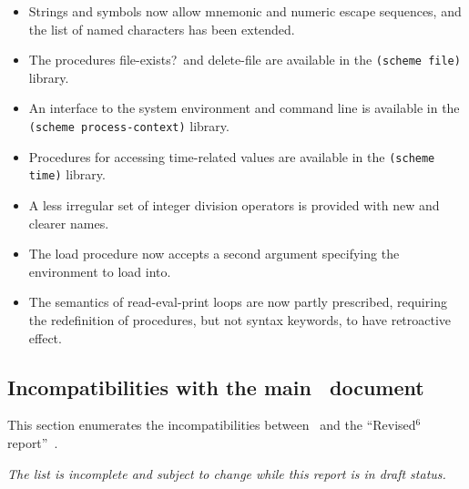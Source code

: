 \begin{itemize}
\item Strings and symbols now allow mnemonic and numeric escape
sequences, and the list of named characters has been extended.

\item The procedures {\cf file-exists?}\ and {\cf delete-file} are available in the
{\tt (scheme file)} library.

\item An interface to the system environment and command line is
available in the {\tt (scheme process-context)} library.

\item Procedures for accessing time-related values are available in the
{\tt (scheme time)} library.

\item A less irregular set of integer division operators is provided
with new and clearer names.

\item The {\cf load} procedure now accepts a second argument specifying the environment to
load into.

\item The semantics of read-eval-print loops are now partly prescribed,
requiring the redefinition of procedures, but not syntax keywords, to have retroactive effect.

\end{itemize}

\subsection*{Incompatibilities with the main \rsixrs\ document}
This section enumerates the incompatibilities between \rsevenrs~and
the ``Revised$^6$ report''~\cite{R6RS}.

{\em The list is incomplete and subject to change while this report is in draft status.}

